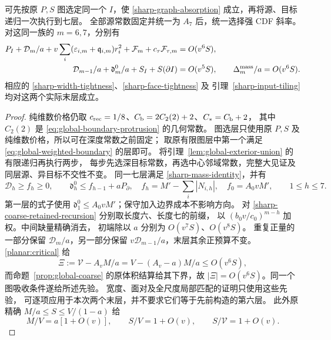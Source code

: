 \begin{lemma}[两个末层的共同先验]\label{planar:priors}
可先按原 \(P,S\) 图选定同一个 \(I\)，使
\eqref{sharp-graph-absorption} 成立，再将源、目标递归一次执行到七层。
全部源常数固定并统一为 \(A_7\) 后，统一选择强 CDF 斜率。
对这同一族的 \(m=6,7\)，分别有
\begin{align}
 P_I+\mathcal D_m/a+
 v\sum_i(\varepsilon_{i,m}+\mathfrak q_{i,m})r_i^2
 +\mathcal F_m+c_\tau\mathcal F_{\tau,m}&=O(v^6S),
 \label{planar:positive-prior}\\
 \mathcal D_{m-1}/a+\mathfrak d_m^0/a+S_I+S(\partial I)&=O(v^5S),
 \qquad \Delta_m^{\rm mass}/a=O(v^6S).
 \label{planar:mass-prior}
\end{align}
相应的 \eqref{sharp-width-tightness}、\eqref{sharp-face-tightness} 及
引理~\ref{sharp-input-tiling} 均对这两个实际末层成立。
\end{lemma}
\begin{proof}
纯维数价格仍取
\(c_{\rm rec}=1/8\)、\(C_{\rm b}=2C_2(2)+2\)、\(C_*=C_{\rm b}+2\)，
其中 \(C_2(2)\) 是 \eqref{eq:global-boundary-protrusion} 的几何常数。
图选层只使用原 \(P,S\) 及纯维数价格，所以可在深度常数之前固定；
取原有限图层中第一个满足 \eqref{eq:global-weighted-boundary} 的层即可。
将引理~\ref{lem:global-exterior-union} 的有限递归再执行两步，
每步先选深目标常数，再选中心邻域常数，完整大见证及同层源、异目标不交性不变。
同一七层满足 \eqref{sharp-mass-identity}，并有
\begin{equation}\label{planar:depth}
 \mathcal D_h\ge f_h\ge0,\qquad
 \mathfrak d_h^0\le f_{h-1}+aP_\partial,
 \quad f_h=M'-\sum_i|N_{i,h}|,\quad f_0=A_0vM',
 \qquad 1\le h\le7.
\end{equation}
第一层的式子使用 \(\mathfrak d_1^0\le A_0vM'\)；保守加入边界成本不影响方向。
对 \eqref{sharp-coarse-retained-recursion} 分别取长度六、长度七的前缀，
以 \((b_0v/c_0)^{m-h}\) 加权。中间缺量精确消去，
初端除以 \(a\) 分别为 \(O(v^7S)\)、\(O(v^8S)\)。
重复正量的一部分保留 \(\mathcal D_m/a\)，另一部分保留
\(v\mathcal D_{m-1}/a\)，末层其余正预算不变。
\eqref{planar:critical} 给
\[
 \Xi:=\mathcal V-A_vM/a=V-(A_v-a)M/a\le O(v^6S),
\]
而命题~\ref{prop:global-coarse} 的原体积结算给其下界，故
\(|\Xi|=O(v^6S)\)。同一个图吸收条件遂给所述先验。
宽度、面对及全尺度局部匹配的证明只使用这些先验，
可逐项应用于本次两个末层，并不要求它们等于先前构造的第六层。
此外原精确 \(M/a\le S\le V/(1-a)\) 给
\begin{equation}\label{planar:leading-masses}
 M/V=a[1+O(v)],\qquad S/V=1+O(v),\qquad S/\mathcal V=1+O(v).
\end{equation}
\end{proof}

